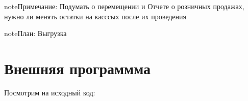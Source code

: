 \documentclass[twoside,11pt,a4paper,notitlepage]{report}
\begin{document}
\begin{sphinxadmonition}{note}{Примечание:}
\sphinxAtStartPar
Подумать о перемещении и Отчете о розничных продажах, нужно ли менять остатки на касссых после их проведения
\end{sphinxadmonition}

\begin{sphinxadmonition}{note}{\label{\detokenize{unf:id2}}План:}
\sphinxAtStartPar
Выгрузка
\end{sphinxadmonition}

\sphinxstepscope


\chapter{Внешняя программма}
\label{\detokenize{prox:id1}}\label{\detokenize{prox::doc}}
\sphinxAtStartPar
Посмотрим на исходный код:

\begin{sphinxVerbatim}[commandchars=\\\{\}]
 
      
           
          \PYG{p}{[}\PYG{p}{]}
        \PYG{p}{[}\PYG{p}{[}\PYG{p}{]}\PYG{p}{]}
\end{sphinxVerbatim}
\end{document}
